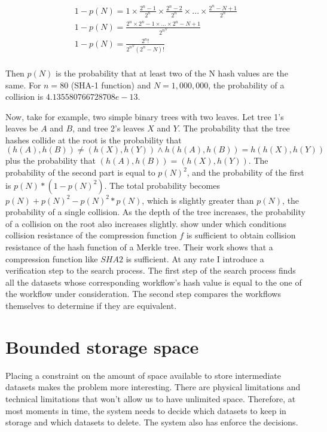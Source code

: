 \begin{multline}
	1 - p(N) = 1 \times \frac{2^n - 1}{2^n} \times \frac{2^n - 2}{2^n} \times . . . \times \frac{2^n - N + 1}{2^n} \\ 
	1 - p(N) = \frac{2^n \times 2^n - 1 \times . . . \times 2^n - N + 1}{2^{n^{N}}} \\ 
	1 - p(N) = \frac{2^n !}{2^{n{^N}} (2^n - N)!} \\
\end{multline}

Then $p(N)$ is the probability that at least two of the N hash values are the same.  For $n=80$ (SHA-1 function) and $N=1,000,000$, the probability of a collision is $4.135580766728708e-13$. 

Now, take for example, two simple binary trees with two leaves.  Let tree 1's leaves be $A$ and $B$, and tree 2's leaves $X$ and $Y$.   The probability that the tree hashes collide at the root is the probability that $(h(A), h(B)) \neq (h(X), h(Y))  \wedge h(h(A), h(B)) = h(h(X), h(Y))$ plus the probability that $(h(A), h(B)) = (h(X), h(Y))$.  The probability of the second part is equal to $p(N)^2$, and the probability of the first is $p(N) * (1 - p(N)^2)$. The total probability becomes $p(N) + p(N)^2 - p(N)^2 * p(N)$, which is slightly greater than $p(N)$, the probability of a single collision.  As the depth of the tree increases, the probability of a collision on the root also increases slightly. \cite{coron2005merkle} show under which conditions collision resistance of the compression function $f$ is sufficient to obtain collision resistance of the hash function of a Merkle tree. Their work shows that a compression function like $SHA2$ is sufficient. At any rate I introduce a verification step to the search process.  The first step of the search process finds all the datasets whose corresponding workflow's hash value is equal to the one of the workflow under consideration. The second step compares the workflows themselves to determine if they are equivalent.

\section{Bounded storage space}
Placing a constraint on the amount of space available to store intermediate datasets makes the problem more interesting. There are physical limitations and technical limitations that won't allow us to have unlimited space.  Therefore, at most moments in time, the system needs to decide which datasets to keep in storage and which datasets to delete. The system also has enforce the decisions.

